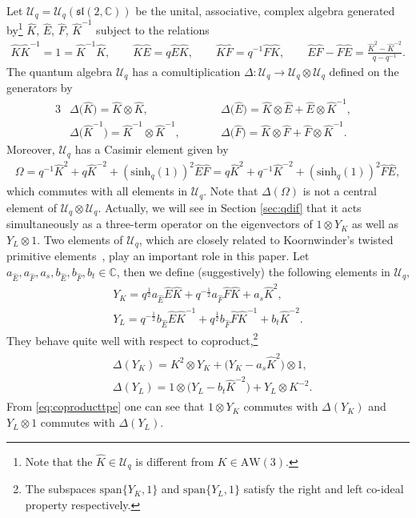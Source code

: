 \documentclass[pdftex]{sigma}
\numberwithin{equation}{section}
\newcommand{\CC}{\mathbb{C}}
\newcommand{\aw}{\mathrm{AW}\!\left(3\right)}
\newcommand{\half}{\frac{1}{2}}
\newcommand{\shq}{\mathrm{sinh}_q}
\newcommand{\Uq}{\mathcal{U}_q}
\newcommand{\uql}[1][q]{\mathcal{U}_{#1}(\mathfrak{sl}(2,\CC))}
\newcommand{\vspan}[1]{\text{span}\{#1\}}
\begin{document}
Let $\Uq=\uql$ be the unital, associative, complex algebra generated by\footnote{Note that the $\hat{K}\in\Uq$ is different from $K\in\aw$.} $\hat{K}$, $\hat{E}$, $\hat{F}$, $\hat{K}^{-1}$ subject to the relations
\begin{gather*}%
	\hat{K}\hat{K}^{-1}=1=\hat{K}^{-1}\hat{K},\qquad \hat{K}\hat{E}=q\hat{E}\hat{K},\qquad \hat{K}\hat{F}=q^{-1}\hat{F}\hat{K},\qquad \hat{E}\hat{F}-\hat{F}\hat{E}=\frac{\hat{K}^2-\hat{K}^{-2}}{q-q^{-1}}.
\end{gather*}
The quantum algebra $\Uq$ has a comultiplication $\Delta\colon \Uq \to \Uq \otimes \Uq$ defined on the generators by
\begin{alignat*}{3}
& \Delta\big(\hat{K}\big)=\hat{K}\otimes \hat{K},\qquad && \Delta\big(\hat{E}\big)=\hat{K}\otimes \hat{E} + \hat{E}\otimes \hat{K}^{-1},&\\
& \Delta\big(\hat{K}^{-1}\big)=\hat{K}^{-1}\otimes \hat{K}^{-1},\qquad && \Delta\big(\hat{F}\big)=\hat{K}\otimes \hat{F} + \hat{F} \otimes \hat{K}^{-1}.&
\end{alignat*}
Moreover, $\Uq$ has a Casimir element given by
\begin{gather*}
	\Omega=q^{-1}\hat{K}^2+q\hat{K}^{-2}+(\shq(1))^2\hat{E}\hat{F} = q\hat{K}^2+q^{-1}\hat{K}^{-2}+(\shq(1))^2\hat{F}\hat{E},%
\end{gather*}
which commutes with all elements in $\Uq$. Note that $\Delta(\Omega)$ is not a central element of ${\Uq\otimes\Uq}$. Actually, we will see in Section \ref{sec:qdif} that it acts simultaneously as a three-term operator on the eigenvectors of $1\otimes Y_K$ as well as $Y_L\otimes 1$.
Two elements of $\Uq$, which are closely related to Koornwinder's twisted primitive ele\-ments~\cite{Koornwinder1993}, play an important role in this paper. Let $a_{\hat{E}},a_{\hat{F}},a_s,b_{\hat{E}},b_{\hat{F}},b_t\in\CC$, then we define (suggestively) the following elements in $\Uq$,
\begin{gather*}
	Y_{K} =q^\half a_{\hat{E}} \hat{E}\hat{K}+ q^{-\half}a_{\hat{F}} \hat{F}\hat{K} + a_s \hat{K}^2,\\ %
	Y_{L} =q^{-\half} b_{\hat{E}} \hat{E}\hat{K}^{-1}+ q^{\half} b_{\hat{F}} \hat{F}\hat{K}^{-1} + b_t \hat{K}^{-2}.%
\end{gather*}	 	
They behave quite well with respect to coproduct,\footnote{The subspaces $\vspan{Y_K,1}$ and $\vspan{Y_L,1}$ satisfy the right and left co-ideal property respectively.}
\begin{align}
	\begin{split}&\Delta(Y_K)=K^2 \otimes Y_K + \big(Y_K -a_s \hat{K}^2\big)\otimes 1,\\
		&\Delta(Y_L)=1\otimes \big(Y_L-b_t \hat{K}^{-2}\big) + Y_L\otimes K^{-2}.\end{split}\label{eq:coproducttpe}
\end{align}
From \eqref{eq:coproducttpe} one can see that $1\otimes Y_K$ commutes with $\Delta(Y_K)$ and $Y_L\otimes 1$ commutes with $\Delta(Y_L)$.
\end{document}
